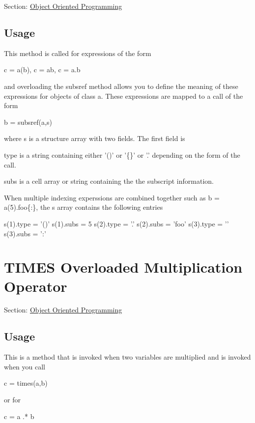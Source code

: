 Section\-: \hyperlink{sec_class}{Object Oriented Programming} \hypertarget{vtkwidgets_vtkxyplotwidget_Usage}{}\subsection{Usage}\label{vtkwidgets_vtkxyplotwidget_Usage}
This method is called for expressions of the form \begin{DoxyVerb}  c = a(b), c = a{b}, c = a.b
\end{DoxyVerb}
 and overloading the {\ttfamily subsref} method allows you to define the meaning of these expressions for objects of class {\ttfamily a}. These expressions are mapped to a call of the form \begin{DoxyVerb}  b = subsref(a,s)
\end{DoxyVerb}
 where {\ttfamily s} is a structure array with two fields. The first field is 
\begin{DoxyItemize}
\item {\ttfamily type} is a string containing either {\ttfamily '()'} or {\ttfamily '\{\}'} or {\ttfamily '.'} depending on the form of the call.  
\item {\ttfamily subs} is a cell array or string containing the the subscript information.  
\end{DoxyItemize}When multiple indexing experssions are combined together such as {\ttfamily b = a(5).foo\{\-:\}}, the {\ttfamily s} array contains the following entries \begin{DoxyVerb}  s(1).type = '()'  s(1).subs = {5}
  s(2).type = '.'   s(2).subs = 'foo'
  s(3).type = '{}'  s(3).subs = ':'
\end{DoxyVerb}
 \hypertarget{class_times}{}\section{T\-I\-M\-E\-S Overloaded Multiplication Operator}\label{class_times}
Section\-: \hyperlink{sec_class}{Object Oriented Programming} \hypertarget{vtkwidgets_vtkxyplotwidget_Usage}{}\subsection{Usage}\label{vtkwidgets_vtkxyplotwidget_Usage}
This is a method that is invoked when two variables are multiplied and is invoked when you call \begin{DoxyVerb}   c = times(a,b)
\end{DoxyVerb}
 or for \begin{DoxyVerb}   c = a .* b
\end{DoxyVerb}
